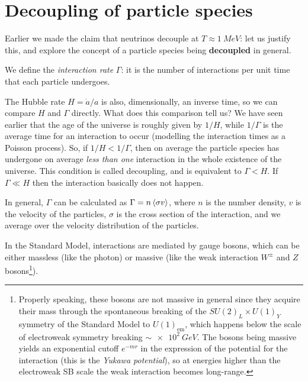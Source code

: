 \documentclass[main.tex]{subfiles}
\begin{document}
\section{Decoupling of particle species}

Earlier we made the claim that neutrinos decouple at \(T \approx \SI{1}{MeV}\): let us justify this, and explore the concept of a particle species being \textbf{decoupled} in general.

We define the \emph{interaction rate} \(\Gamma \): it is the number of interactions per unit time that each particle undergoes.

The Hubble rate \(H = \dot{a} / a \) is also, dimensionally, an inverse time, so we can compare \(H\) and \(\Gamma \) directly. 
What does this comparison tell us?
We have seen earlier that the age of the universe is roughly given by \(1 / H \), while \(1/ \Gamma \) is the average time for an interaction to occur (modelling the interaction times as a Poisson process). 
So, if \(1 / H < 1 / \Gamma \), then on average the particle species has undergone on average \emph{less than one} interaction in the whole existence of the universe. This condition is called decoupling, and is equivalent to \(\Gamma < H\). 
If \(\Gamma  \ll H\) then the interaction basically does not happen. 


In general, \(\Gamma \) can be calculated as \(\Gamma = n \expval{\sigma v}\), where \(n\) is the number density, \(v\) is the velocity of the particles,  \(\sigma \) is the cross section of the interaction, and we average over the velocity distribution of the particles. 

In the Standard Model, interactions are mediated by gauge bosons, which can be either massless (like the photon) or massive (like the weak interaction \(W^{\pm}\) and \(Z\) bosons\footnote{Properly speaking, these bosons are not massive in general since they acquire their mass through the spontaneous breaking of the \(SU(2)_L \times U(1)_Y\) symmetry of the Standard Model to \(U(1)_{\text{em}}\), which happens below the scale of electroweak symmetry breaking \(\sim \SI{e2}{GeV}\). The bosons being massive yields an exponential cutoff \(e^{-mr}\) in the expression of the potential for the interaction (this is the \emph{Yukawa potential}), so at energies higher than the electroweak SB scale the weak interaction becomes long-range.}).
\end{document}
